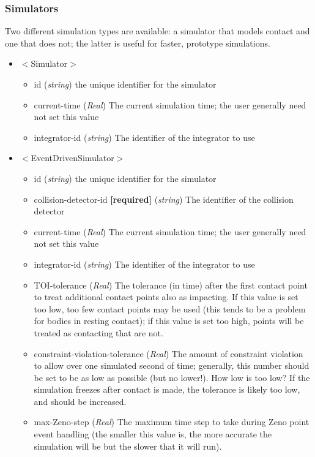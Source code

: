 \documentclass{article}
\begin{document}
\begin{landscape}
\begin{itemize}
\subsubsection{Simulators}
Two different simulation types are available: a simulator that models contact and one that does not; the latter is useful for faster, prototype simulations.

\begin{itemize}
\item $<$Simulator$>$
\begin{itemize}
\item id  (\emph{string}) the unique identifier for the simulator
\item current-time  (\emph{Real}) The current simulation time; the user generally need not set this value
\item integrator-id  (\emph{string}) The identifier of the integrator to use
\end{itemize}
\item $<$EventDrivenSimulator$>$
\begin{itemize}
\item id  (\emph{string}) the unique identifier for the simulator
\item collision-detector-id  \textbf{[required]} (\emph{string}) The identifier of the collision detector
\item current-time  (\emph{Real}) The current simulation time; the user generally need not set this value
\item integrator-id  (\emph{string}) The identifier of the integrator to use
\item TOI-tolerance  (\emph{Real}) The tolerance (in time) after the first contact point to treat additional contact points also as impacting. If this value is set too low, too few contact points may be used (this tends to be a problem for bodies in resting contact); if this value is set too high, points will be treated as contacting that are not.
\item constraint-violation-tolerance  (\emph{Real})  The amount of constraint violation to allow over one simulated second of time; generally, this number should be set to be as low as possible (but no lower!).  How low is too low?  If the simulation freezes after contact is made, the tolerance is likely too low, and should be increased.
\item max-Zeno-step  (\emph{Real}) The maximum time step to take during Zeno point event handling (the smaller this value is, the more accurate the simulation will be but the slower that it will run).
\end{itemize}
\end{itemize}


\end{itemize}
\end{landscape}
\end{document}
